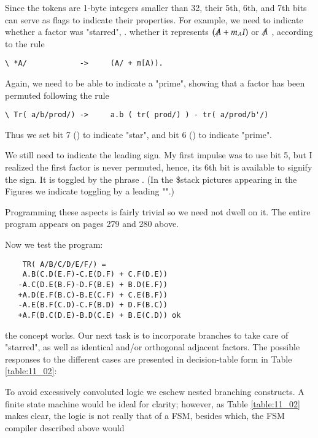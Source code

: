 Since the tokens are 1-byte integers smaller than 32, their 5th, 6th, and 7th bits can serve as flags to indicate their properties. For example, we need to indicate whether a factor was "starred", \ie. whether it represents $(\tr{A} + m_{A}I)$ or $\tr{A}$ , according to the rule

\begin{verbatim}
\ *A/            ->     (A/ + m[A)).
\end{verbatim}

Again, we need to be able to indicate a "prime", showing that a factor has been permuted following the rule

\begin{verbatim}
\ Tr( a/b/prod/) ->     a.b ( tr( prod/) ) - tr( a/prod/b'/)
\end{verbatim}

Thus we set bit 7 () to indicate "star", and bit 6 () to indicate "prime".

We still need to indicate the leading sign. My first impulse was to use bit 5, but I realized the first factor is never permuted, hence, its 6th bit is available to signify the sign. It is toggled by the phrase . (In the \$stack pictures appearing in the Figures we indicate toggling by a leading "\bc{\~}".)

Programming these aspects is fairly trivial so we need not dwell on it. The entire program appears on pages 279 and 280 above.

Now we test the program:

\begin{lstlisting}
    TR( A/B/C/D/E/F/) =
    A.B(C.D(E.F)-C.E(D.F) + C.F(D.E))
   -A.C(D.E(B.F)-D.F(B.E) + B.D(E.F))
   +A.D(E.F(B.C)-B.E(C.F) + C.E(B.F))
   -A.E(B.F(C.D)-C.F(B.D) + D.F(B.C))
   +A.F(B.C(D.E)-B.D(C.E) + B.E(C.D)) ok
\end{lstlisting}

 the concept works. Our next task is to incorporate branches to take care of "starred", as well as identical and/or orthogonal adjacent factors. The possible responses to the different cases are presented in decision-table form in Table \ref{table:11_02}:

To avoid excessively convoluted logic we eschew nested branching constructs. A finite state machine would be ideal for clarity; however, as Table \ref{table:11_02} makes clear, the logic is not really that of a FSM, besides which, the FSM compiler described above would

